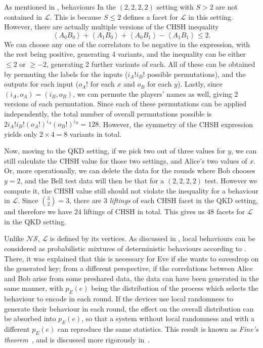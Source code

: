 \documentclass[10pt, a4paper]{article}
\numberwithin{equation}{section} %
\theoremstyle{definition}
\theoremstyle{plain}
\newcommand{\?}{\mathrel{?}} %
\newcommand{\angleb}[1]{\left\langle #1 \right\rangle} %
\newcommand{\Ls}{\mathcal{L}}
\newcommand{\NSs}{\mathcal{NS}}
\begin{document}
      As mentioned in , behaviours In the \((2,2,2,2)\) setting with \(S > 2\) are not contained in \(\Ls\). This is because \(S \leq 2\) defines a facet for \(\Ls\) in this setting. However, there are actually multiple versions of the CHSH inequality
      \[ \angleb{A_0 B_0} + \angleb{A_1 B_0} + \angleb{A_0 B_1} - \angleb{A_1 B_1} \leq 2. \]
      We can choose any one of the correlators to be negative in the expression, with the rest being positive, generating 4 variants, and the inequality can be either \(\leq 2\) or \(\geq -2\), generating 2 further variants of each. All of these can be obtained by permuting the labels for the inputs (\(i_A!i_B!\) possible permutations), and the outputs for each input (\(o_A!\) for each \(x\) and \(o_B\) for each \(y\)). Lastly, since \((i_A, o_A) = (i_B, o_B)\), we can permute the players' names as well, giving 2 versions of each permutation. Since each of these permutations can be applied independently, the total number of overall permutations possible is \(2i_A!i_B!(o_A!)^{i_A}(o_B!)^{i_B} = 128\). However, the symmetry of the CHSH expression yields only \(2 \times 4 = 8\) variants in total.

      Now, moving to the QKD setting, if we pick two out of three values for \(y\), we can still calculate the CHSH value for those two settings, and Alice's two values of \(x\). Or, more operationally, we can delete the data for the rounds where Bob chooses \(y=2\), and the Bell test data will then be that for a \((2,2,2,2)\) test. However we compute it, the CHSH value still should not violate the inequality for a behaviour in \(\Ls\). Since \(\binom{3}{2} = 3\), there are 3 \emph{liftings} of each CHSH facet in the QKD setting, and therefore we have 24 liftings of CHSH in total. This gives us 48 facets for \(\Ls\) in the QKD setting.

      Unlike \(\NSs\), \(\Ls\) is defined by its vertices. As discussed in , local behaviours can be considered as probabilistic mixtures of deterministic behaviours according to . There, it was explained that this is necessary for Eve if she wants to eavesdrop on the generated key; from a different perspective, if the correlations between Alice and Bob arise from some preshared data, the data can have been generated in the same manner, with \(p_E(e)\) being the distribution of the process which selects the behaviour to encode in each round. If the devices use local randomness to generate their behaviour in each round, the effect on the overall distribution can be absorbed into \(p_E(e)\), so that a system without local randomness and with a different \(p_E(e)\) can reproduce the same statistics. This result is known as \emph{Fine's theorem}~\cite{FineThm}, and is discussed more rigorously in~\cite{BellNonlocality}.
\end{document}
